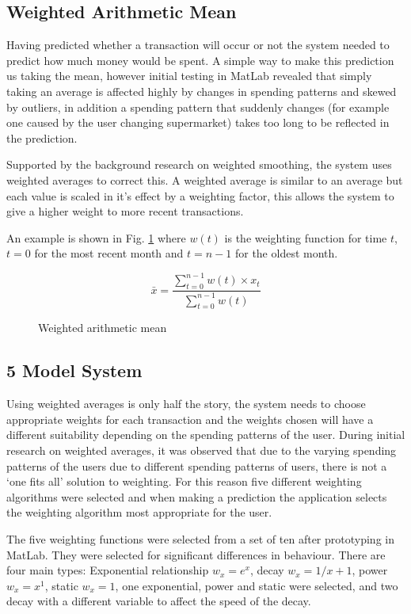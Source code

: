 \subsection{Weighted Arithmetic Mean}
Having predicted whether a transaction will occur or not the system needed to predict how much money would be spent. A simple way to make this prediction us taking the mean, however initial testing in MatLab revealed that simply taking an average is affected highly by changes in spending patterns and skewed by outliers, in addition a spending pattern that suddenly changes (for example one caused by the user changing supermarket) takes too long to be reflected in the prediction.

Supported by the background research on weighted smoothing, the system uses weighted averages to correct this. A weighted average is similar to an average but each value is scaled in it's effect by a weighting factor, this allows the system to give a higher weight to more recent transactions.

An example is shown in Fig. \ref{fig:weighting} where $w(t)$ is the weighting function for time $t$, $t = 0$ for the most recent month and $t = n - 1$ for the oldest month. 

\begin{figure}[h]
    \centering
    \[
        \bar{x} = 
        \frac{
                \sum\limits^{n-1}_{t=0}{w(t) \times x_t}
            }{
                \sum\limits_{t=0}^{n-1}{w(t)}
        } 
    \]
    \caption{Weighted arithmetic mean}
    \label{fig:weighting}
\end{figure}

\subsection{5 Model System}
Using weighted averages is only half the story, the system needs to choose appropriate weights for each transaction and the weights chosen will have a different suitability depending on the spending patterns of the user.
% 
During initial research on weighted averages, it was observed that due to the varying spending patterns of the users due to different spending patterns of users, there is not a `one fits all' solution to weighting.
%
For this reason five different weighting algorithms were selected and when making a prediction the application selects the weighting algorithm most appropriate for the user.

The five weighting functions were selected from a set of ten after prototyping in MatLab. They were selected for significant differences in behaviour. There are four main types: Exponential relationship $w_x = e^{x}$, decay $w_x = {1}/{x + 1}$, power $w_x = x^1 $, static $w_x = 1$, one exponential, power and static were selected, and two decay with a different variable to affect the speed of the decay. 

